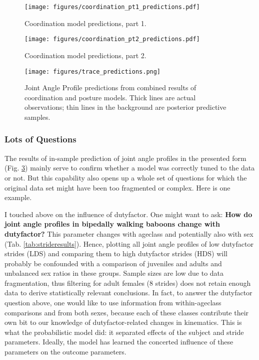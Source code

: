 \begin{figure}[h!]
\centering
\texttt{[image: figures/coordination\_pt1\_predictions.pdf]}
\caption{\label{fig:coordination1}Coordination model predictions, part 1.}
\end{figure}

\begin{figure}[h!]
\centering
\texttt{[image: figures/coordination\_pt2\_predictions.pdf]}
\caption{\label{fig:coordination2}Coordination model predictions, part 2.}
\end{figure}


\begin{figure}[h!]
\centering
\texttt{[image: figures/trace\_predictions.png]}
\caption{\label{fig:japprediction}Joint Angle Profile predictions from combined results of coordination and posture models. Thick lines are actual observations; thin lines in the background are posterior predictive samples.}
\end{figure}


\clearpage
\subsubsection{Lots of Questions}
\label{sec:orgc1e641b}
The results of in-sample prediction of joint angle profiles in the presented form (Fig. \ref{fig:japprediction}) mainly serve to confirm whether a model was correctly tuned to the data or not.
But this capability also opens up a whole set of questions for which the original data set might have been too fragmented or complex.
Here is one example.


I touched above on the influence of dutyfactor.
One might want to ask:
\textbf{How do joint angle profiles in bipedally walking baboons change with dutyfactor?}
This parameter changes with ageclass and potentially also with sex (Tab. \ref{tab:strideresults}).
Hence, plotting all joint angle profiles of low dutyfactor strides (LDS) and comparing them to high dutyfactor strides (HDS) will probably be confounded with a comparison of juveniles and adults and unbalanced sex ratios in these groups.
Sample sizes are low due to data fragmentation, thus filtering for adult females (8 strides) does not retain enough data to derive statistically relevant conclusions.
In fact, to answer the dutyfactor question above, one would like to use information from within-ageclass comparisons and from both sexes, because each of these classes contribute their own bit to our knowledge of dutyfactor-related changes in kinematics.
This is what the probabilistic model did: it separated effects of the subject and stride parameters.
Ideally, the model has learned the concerted influence of these parameters on the outcome parameters.


